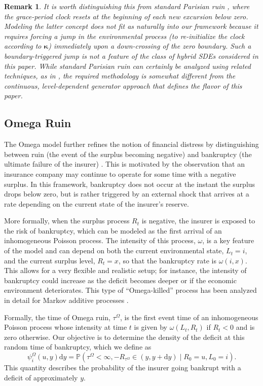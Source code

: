 \documentclass[11pt]{article}
\numberwithin{table}{section}
\numberwithin{figure}{section}
\numberwithin{equation}{section}
\newcommand{\dd}{\mathrm{d}}
\newcommand{\1}{{\mathbf 1}}
\newcommand{\0}{\mat{0}}
\newtheorem{remark}{Remark}[section]
\begin{document}
\begin{remark}
It is worth distinguishing this from standard Parisian ruin \cite{dassios2008parisian}, where the grace-period clock resets at the beginning of each new excursion below zero. Modeling the latter concept does not fit as naturally into our framework because it requires forcing a jump in the environmental process (to re-initialize the clock according to \(\bm{\kappa}\)) immediately upon a down-crossing of the zero boundary. Such a boundary-triggered jump is not a feature of the class of hybrid SDEs considered in this paper. While standard Parisian ruin can certainly be analyzed using related techniques, as in \cite{bladt2019parisian}, the required methodology is somewhat different from the continuous, level-dependent generator approach that defines the flavor of this paper.
\end{remark}

\subsection{Omega Ruin}

The Omega model further refines the notion of financial distress by distinguishing between ruin (the event of the surplus becoming negative) and bankruptcy (the ultimate failure of the insurer) \cite{albrecher2011gammaomega,gerber2012omega,li2018fluctuations}. This is motivated by the observation that an insurance company may continue to operate for some time with a negative surplus. In this framework, bankruptcy does not occur at the instant the surplus drops below zero, but is rather triggered by an external shock that arrives at a rate depending on the current state of the insurer's reserve.

More formally, when the surplus process \(R_t\) is negative, the insurer is exposed to the risk of bankruptcy, which can be modeled as the first arrival of an inhomogeneous Poisson process. The intensity of this process, \(\omega\), is a key feature of the model and can depend on both the current environmental state, \(L_t = i\), and the current surplus level, \(R_t = x\), so that the bankruptcy rate is \(\omega(i,x)\). This allows for a very flexible and realistic setup; for instance, the intensity of bankruptcy could increase as the deficit becomes deeper or if the economic environment deteriorates. This type of ``Omega-killed'' process has been analyzed in detail for Markov additive processes \cite{czarna2018omega}.

Formally, the time of Omega ruin, \(\tau^\Omega\), is the first event time of an inhomogeneous Poisson process whose intensity at time \(t\) is given by \(\omega(L_t, R_t)\) if \(R_t<0\) and is zero otherwise. Our objective is to determine the density of the deficit at this random time of bankruptcy, which we define as
\[
\psi_i^\Omega(u, y) \dd y = \mathbb{P}(\tau^\Omega < \infty, -R_{\tau^\Omega} \in (y, y+\dd y) \mid R_0 = u, L_0 = i).
\]
This quantity describes the probability of the insurer going bankrupt with a deficit of approximately \(y\).
\end{document}
